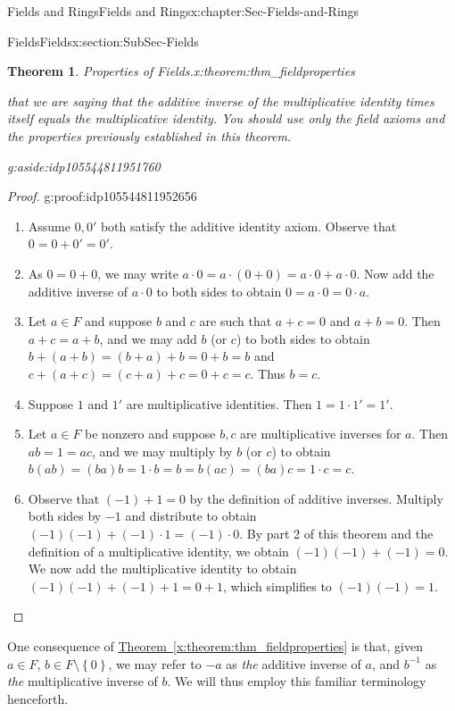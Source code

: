 \documentclass[oneside,10pt,]{book}
\newcommand{\xreffont}{\relax}
\numberwithin{equation}{section}
\newcommand{\set}[1]{\left\{ {#1} \right\}}
\newtheorem{theorem}{Theorem}[section]
\begin{document}
\begin{chapterptx}{Fields and Rings}{}{Fields and Rings}{}{}{x:chapter:Sec-Fields-and-Rings}
\begin{sectionptx}{Fields}{}{Fields}{}{}{x:section:SubSec-Fields}
\begin{theorem}{Properties of Fields.}{}{x:theorem:thm_fieldproperties}
\begin{enumerate}
\noindentNote that we are saying that the additive inverse of the multiplicative identity times itself equals the multiplicative identity. You should use only the field axioms and the properties previously established in this theorem.%
\begin{aside}{}{g:aside:idp105544811951760}%
\end{aside}
%
\end{enumerate}
%
\end{theorem}
\begin{proof}{}{g:proof:idp105544811952656}
%
\begin{enumerate}
\item{}Assume \(0, 0'\) both satisfy the additive identity axiom. Observe that \(0 = 0 + 0' = 0'\).%
\item{}As \(0 = 0 + 0\), we may write \(a\cdot 0 = a\cdot (0 + 0) = a\cdot 0 + a \cdot 0\). Now add the additive inverse of \(a\cdot 0\) to both sides to obtain \(0 = a \cdot 0 = 0\cdot a\).%
\item{}Let \(a\in F\) and suppose \(b\) and \(c\) are such that \(a+c = 0\) and \(a+b = 0\). Then \(a+c = a+b\), and we may add \(b\) (or \(c\)) to both sides to obtain \(b+(a+b) = (b+a)+b = 0 + b = b\) and \(c+(a+c) = (c+a)+c = 0 + c = c\). Thus \(b=c\).%
\item{}Suppose \(1\) and \(1'\) are multiplicative identities. Then \(1 = 1 \cdot 1' = 1'\).%
\item{}Let \(a\in F\) be nonzero and suppose \(b,c\) are multiplicative inverses for \(a\). Then \(ab = 1 = ac\), and we may multiply by \(b\) (or \(c\)) to obtain \(b(ab) = (ba)b = 1\cdot b = b = b(ac) = (ba)c = 1\cdot c = c\).%
\item{}Observe that \((-1) + 1 = 0\) by the definition of additive inverses. Multiply both sides by \(-1\) and distribute to obtain \((-1)(-1) + (-1)\cdot 1 = (-1)\cdot 0\). By part 2 of this theorem and the definition of a multiplicative identity, we obtain \((-1)(-1) + (-1) = 0\). We now add the multiplicative identity to obtain \((-1)(-1) + (-1) + 1 = 0 + 1\), which simplifies to \((-1)(-1) = 1\).%
\end{enumerate}
\end{proof}
One consequence of \hyperref[x:theorem:thm_fieldproperties]{Theorem~{\xreffont\ref{x:theorem:thm_fieldproperties}}} is that, given \(a\in F\), \(b\in F\setminus \set{0}\), we may refer to \(-a\) as \emph{the} additive inverse of \(a\), and \(b^{-1}\) as \emph{the} multiplicative inverse of \(b\). We will thus employ this familiar terminology henceforth.%

\end{sectionptx}
\end{chapterptx}
\end{document}
